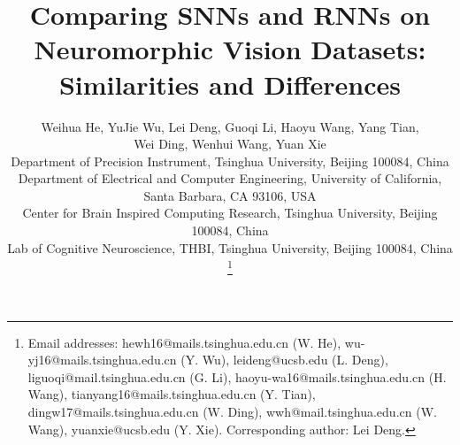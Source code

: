 \documentclass[journal,10pt,twocolumn]{IEEETran}
\begin{document}
\title{Comparing SNNs and RNNs on Neuromorphic Vision Datasets: Similarities and Differences}


\author{Weihua He, YuJie Wu, Lei Deng, Guoqi Li, Haoyu Wang, Yang Tian, \\Wei Ding, Wenhui Wang, Yuan Xie\\ \vspace{10pt}
Department of Precision Instrument, Tsinghua University, Beijing 100084, China\\
Department of Electrical and Computer Engineering, University of California, Santa Barbara, CA 93106, USA\\
Center for Brain Inspired Computing Research, Tsinghua University, Beijing 100084, China\\
Lab of Cognitive Neuroscience, THBI, Tsinghua University, Beijing 100084, China
\thanks{Email addresses: hewh16@mails.tsinghua.edu.cn (W. He), wu-yj16@mails.tsinghua.edu.cn (Y. Wu), leideng@ucsb.edu (L. Deng), liguoqi@mail.tsinghua.edu.cn (G. Li), haoyu-wa16@mails.tsinghua.edu.cn (H. Wang), tianyang16@mails.tsinghua.edu.cn (Y. Tian), dingw17@mails.tsinghua.edu.cn (W. Ding), wwh@mail.tsinghua.edu.cn (W. Wang), yuanxie@ucsb.edu (Y. Xie). Corresponding author: Lei Deng.}
}

\maketitle
\end{document}
